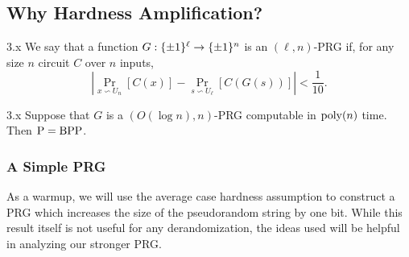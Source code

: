 \documentclass[11pt]{article}
\begin{document}
\subsection{Why Hardness Amplification?}

\begin{definition}{3.x}
    We say that a function $G : \{\pm 1\}^\ell \rightarrow \{\pm 1\}^{n}$ is an $(\ell, n)$-PRG if, for any size $n$ circuit $C$ over $n$ inputs, 
    \begin{equation*}
        \left|\Pr_{x \backsim U_n}[C(x)] - \Pr_{s \backsim U_\ell}[C(G(s))]\right| < \frac{1}{10}.
    \end{equation*}
\end{definition}

\begin{theorem}{3.x} Suppose that $G$ is a $(O(\log n), n)$-PRG computable in $\mathrm{poly}(n)$ time. Then $\mathrm{P} = \mathrm{BPP}$.
\end{theorem}

\subsubsection{A Simple PRG}

As a warmup, we will use the average case hardness assumption to construct a PRG which increases the size of the pseudorandom string by one bit. While this result itself is not useful for any derandomization, the ideas used will be helpful in analyzing our stronger PRG.
\end{document}
